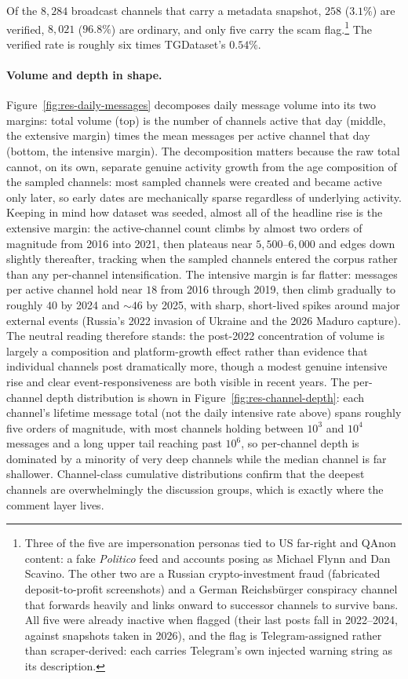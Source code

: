Of the $8{,}284$ broadcast channels that carry a metadata snapshot, $258$ ($3.1\%$) are verified, $8{,}021$ ($96.8\%$) are ordinary, and only five carry the scam flag.\footnote{Three of the five are impersonation personas tied to US far-right and QAnon content: a fake \emph{Politico} feed and accounts posing as Michael Flynn and Dan Scavino. The other two are a Russian crypto-investment fraud (fabricated deposit-to-profit screenshots) and a German Reichs\-b\"urger conspiracy channel that forwards heavily and links onward to successor channels to survive bans. All five were already inactive when flagged (their last posts fall in 2022--2024, against snapshots taken in 2026), and the flag is Telegram-assigned rather than scraper-derived: each carries Telegram's own injected warning string as its description.} The verified rate is roughly six times TGDataset's $0.54\%$.

\paragraph{Volume and depth in shape.}
Figure~\ref{fig:res-daily-messages} decomposes daily message volume into its two margins: total volume (top) is the number of channels active that day (middle, the extensive margin) times the mean messages per active channel that day (bottom, the intensive margin). The decomposition matters because the raw total cannot, on its own, separate genuine activity growth from the age composition of the sampled channels: most sampled channels were created and became active only later, so early dates are mechanically sparse regardless of underlying activity. Keeping in mind how dataset was seeded, almost all of the headline rise is the extensive margin: the active-channel count climbs by almost two orders of magnitude from 2016 into 2021, then plateaus near $5{,}500$--$6{,}000$ and edges down slightly thereafter, tracking when the sampled channels entered the corpus rather than any per-channel intensification. The intensive margin is far flatter: messages per active channel hold near $18$ from 2016 through 2019, then climb gradually to roughly $40$ by 2024 and $\sim 46$ by 2025, with sharp, short-lived spikes around major external events (Russia's 2022 invasion of Ukraine and the 2026 Maduro capture). The neutral reading therefore stands: the post-2022 concentration of volume is largely a composition and platform-growth effect rather than evidence that individual channels post dramatically more, though a modest genuine intensive rise and clear event-responsiveness are both visible in recent years. The per-channel depth distribution is shown in Figure~\ref{fig:res-channel-depth}: each channel's lifetime message total (not the daily intensive rate above) spans roughly five orders of magnitude, with most channels holding between $10^3$ and $10^4$ messages and a long upper tail reaching past $10^6$, so per-channel depth is dominated by a minority of very deep channels while the median channel is far shallower. Channel-class cumulative distributions confirm that the deepest channels are overwhelmingly the discussion groups, which is exactly where the comment layer lives.


